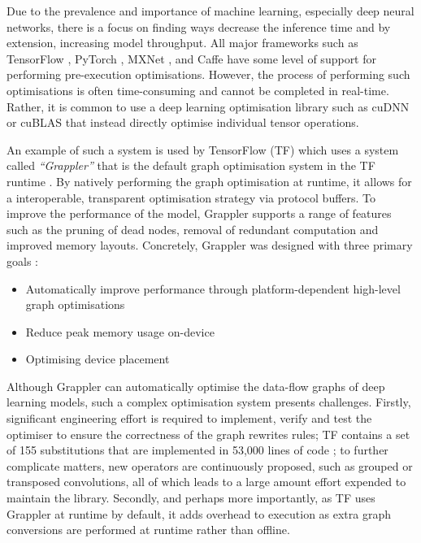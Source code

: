Due to the prevalence and importance of machine learning, especially deep neural networks, there is a focus on finding ways decrease the inference time and by extension, increasing model throughput. All major frameworks such as TensorFlow \cite{tensorflow2015-whitepaper}, PyTorch \cite{pytorch}, MXNet \cite{chen2015mxnet}, and Caffe \cite{jia2014caffe} have some level of support for performing pre-execution optimisations. However, the process of performing such optimisations is often time-consuming and cannot be completed in real-time. Rather, it is common to use a deep learning optimisation library such as cuDNN \cite{chetlur2014cudnn} or cuBLAS \cite{cublas2008} that instead directly optimise individual tensor operations.

An example of such a system is used by TensorFlow (TF) which uses a system called \textit{``Grappler''} that is the default graph optimisation system in the TF runtime \cite{larsen2019tensorflow}. By natively performing the graph optimisation at runtime, it allows for a interoperable, transparent optimisation strategy via protocol buffers. To improve the performance of the model, Grappler supports a range of features such as the pruning of dead nodes, removal of redundant computation and improved memory layouts. Concretely, Grappler was designed with three primary goals \cite{tensorflow2015-whitepaper, larsen2019tensorflow}:

\begin{itemize}
  \item Automatically improve performance through platform-dependent high-level graph optimisations
  \item Reduce peak memory usage on-device
  \item Optimising device placement
\end{itemize}

Although Grappler can automatically optimise the data-flow graphs of deep learning models, such a complex optimisation system presents challenges. Firstly, significant engineering effort is required to implement, verify and test the optimiser to ensure the correctness of the graph rewrites rules; TF contains a set of 155 substitutions that are implemented in 53,000 lines of code \cite{jia2019taso}; to further complicate matters, new operators are continuously proposed, such as grouped or transposed convolutions, all of which leads to a large amount effort expended to maintain the library. Secondly, and perhaps more importantly, as TF uses Grappler at runtime by default, it adds overhead to execution as extra graph conversions are performed at runtime rather than offline.

